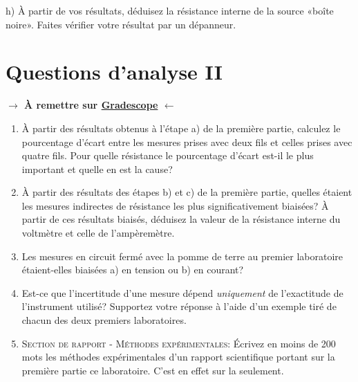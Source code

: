 \documentclass[canadien,12pt,oneside,letterpaper]{article}
\begin{document}
h) À partir de vos résultats, déduisez la résistance interne de la source «boîte noire». Faites vérifier votre résultat par un dépanneur.


\section{Questions d'analyse II} \label{sec:grade}
\vspace{-0.5cm}
\noindent\textbf{$\rightarrow$ À remettre sur \href{https://www.gradescope.com/}{Gradescope} $\leftarrow$}

\begin{enumerate}
\item À partir des résultats obtenus à l'étape a) de la première partie, calculez le pourcentage d'écart entre les mesures prises avec deux fils et celles prises avec quatre fils. Pour quelle résistance le pourcentage d'écart est-il le plus important et quelle en est la cause?
\item À partir des résultats des étapes b) et c) de la première partie, quelles étaient les mesures indirectes de résistance les plus significativement biaisées? À partir de ces résultats biaisés, déduisez la valeur de la résistance interne du voltmètre et celle de l'ampèremètre.
\item Les mesures en circuit fermé avec la pomme de terre au premier laboratoire étaient-elles biaisées a) en tension ou b) en courant?
\item Est-ce que l'incertitude d'une mesure dépend \textit{uniquement} de l'exactitude de l'instrument utilisé? Supportez votre réponse à l'aide d'un exemple tiré de chacun des deux premiers laboratoires.
\item \textsc{Section de rapport - Méthodes expérimentales:} Écrivez en moins de 200 mots les méthodes expérimentales d'un rapport scientifique portant sur la première partie ce laboratoire. C'est en effet sur la  seulement.
\end{enumerate}
\end{document}
